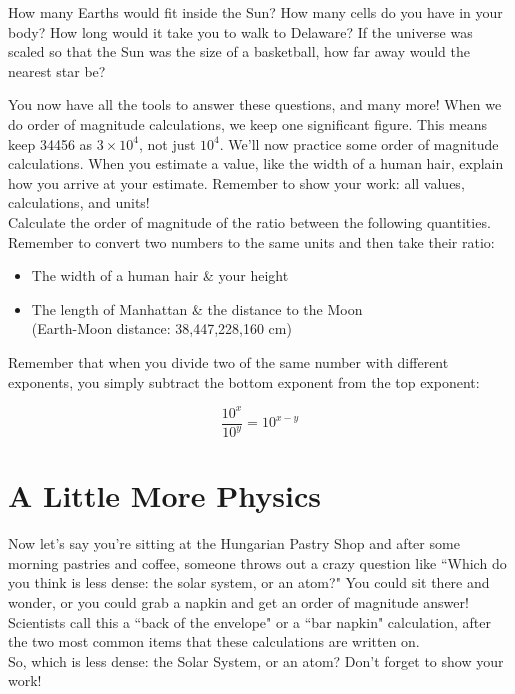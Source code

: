 \documentclass[12pt]{article}
\begin{document}
How many Earths would fit inside the Sun? How many cells do you have in your body? How long would it take you to walk to Delaware? If the universe was scaled so that the Sun was the size of a basketball, how far away would the nearest star be?

You now have all the tools to answer these questions, and many more! When we do order of magnitude calculations, we keep one significant figure. This means keep 34456 as ${3 \times 10^4}$, not just $10^4$. We'll now practice some order of magnitude calculations. When you estimate a value, like the width of a human hair, explain how you arrive at your estimate. Remember to show your work: all values, calculations, and units!\\

Calculate the order of magnitude of the ratio between the following quantities. Remember to convert two numbers to the same units and then take their ratio: 

\begin{itemize}
\item{The width of a human hair \& your height}
\item{The length of Manhattan \& the distance to the Moon \\
(Earth-Moon distance: 38,447,228,160 cm)}
\end{itemize}

Remember that when you divide two of the same number with different exponents, you simply subtract the bottom exponent from the top exponent:

\begin{equation}
\frac{10^x}{10^y} = 10^{x-y}
\end{equation}

\section*{A Little More Physics}

Now let's say you're sitting at the Hungarian Pastry Shop and after some morning pastries and coffee, someone throws out a crazy question like ``Which do you think is less dense: the solar system, or an atom?" You could sit there and wonder, or you could grab a napkin and get an order of magnitude answer! Scientists call this a ``back of the envelope" or a ``bar napkin" calculation, after the two most common items that these calculations are written on. \\

So, which is less dense: the Solar System, or an atom? Don't forget to show your work! \\
\end{document}

